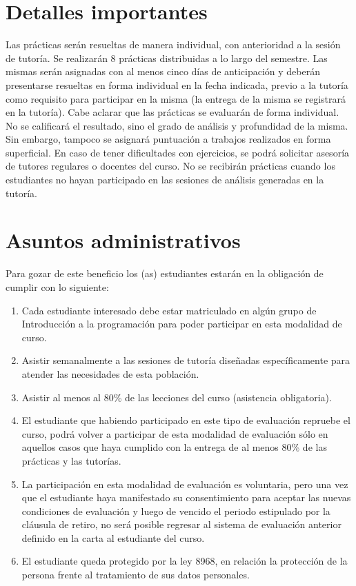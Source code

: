 \documentclass[11pt]{proc}
\newcommand{\nombreCurso}{Introducción a la programación }
\begin{document}
\section*{Detalles importantes}
Las prácticas serán resueltas de manera individual, con anterioridad a la sesión de tutoría.
Se realizarán 8 prácticas distribuidas a lo largo del semestre. Las mismas serán asignadas con al menos cinco días de anticipación y deberán presentarse resueltas en forma individual en la fecha indicada, previo a la tutoría como requisito para participar en la misma (la entrega de la misma se registrará en la tutoría).
Cabe aclarar que las prácticas se evaluarán de forma individual. No se calificará el resultado, sino el grado de análisis y profundidad de la misma. Sin embargo, tampoco se asignará puntuación a trabajos realizados en forma superficial. En caso de tener dificultades con ejercicios, se podrá solicitar asesoría de tutores regulares o docentes del curso. No se recibirán prácticas cuando los estudiantes no hayan participado en las sesiones de análisis generadas en la tutoría.

\section*{Asuntos administrativos}
Para gozar de este beneficio los (as) estudiantes estarán en la obligación de cumplir con lo siguiente:
\begin{enumerate}
\item Cada estudiante interesado debe estar matriculado en algún grupo de \nombreCurso para poder participar en esta modalidad de curso.
\item Asistir semanalmente a las sesiones de tutoría diseñadas específicamente para atender las necesidades de esta población.
\item Asistir al menos al 80\% de las lecciones del curso (asistencia obligatoria).
\item El estudiante que habiendo participado en este tipo de evaluación repruebe el curso, podrá volver a participar de esta modalidad de evaluación sólo en aquellos casos que haya cumplido con la entrega de al menos 80\% de las prácticas y las tutorías. 
\item La participación en esta modalidad de evaluación es voluntaria, pero una vez que el estudiante haya manifestado su consentimiento para aceptar las nuevas condiciones de evaluación y luego de vencido el periodo estipulado por la cláusula de retiro, no será posible regresar al sistema de evaluación anterior definido en la carta al estudiante del curso.
\item El estudiante queda protegido por la ley 8968, en relación la protección de la persona frente al tratamiento de sus datos personales. 
\end{enumerate}
\end{document}
